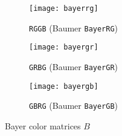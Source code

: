 \begin{figure}[ht]
  \centering
  \begin{subfigure}[b]{0.3\textwidth}
    \centering
    \texttt{[image: bayerrg]}
    \caption{\texttt{RGGB} (Baumer \texttt{BayerRG})}
    \label{subfig:bayerrg}
  \end{subfigure}
  \begin{subfigure}[b]{0.3\textwidth}
    \centering
    \texttt{[image: bayergr]}
    \caption{\texttt{GRBG} (Baumer \texttt{BayerGR})}
    \label{subfig:bayergr}
  \end{subfigure}
  \begin{subfigure}[b]{0.3\textwidth}
    \centering
    \texttt{[image: bayergb]}
    \caption{\texttt{GBRG} (Baumer \texttt{BayerGB})}
    \label{subfig:bayergb}
  \end{subfigure}
  \caption{Bayer color matrices $B$}
  \label{fig:bayer}
\end{figure}
